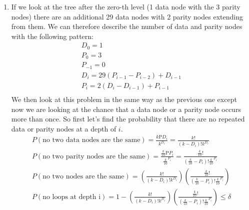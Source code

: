 \documentclass[11pt]{article}
\begin{document}
\begin{enumerate}
\begin{enumerate}
        \item
        	If we look at the tree after the zero-th level (1 data node with the 3 parity nodes) there are an additional 29 data nodes with 2 parity nodes extending from them. We can therefore describe the number of data and parity nodes with the following pattern: \\
	\begin{eqnarray*}
	D_0=1 \\ P_0=3 \\ P_{-1}=0 \\
	D_i=29(P_{i-1}-P_{i-2})+D_{i-1} \\
	P_i=2(D_i-D_{i-1})+P_{i-1} \\
	\end{eqnarray*}
	We then look at this problem in the same way as the previous one except now we are looking at the chance that a data node or a parity node occurs more than once. So first let's find the probability that there are no repeated data or parity nodes at a depth of $i$. \\
	\begin{eqnarray*}
	   P(\mbox{no two data nodes are the same}) = \frac{k\mbox{P}D_i}{k^{D_i}} = \frac{k!}{(k-D_i)!k^{D_i}}\\
	   P(\mbox{no two parity nodes are the same}) = \frac{\frac{k}{10}\mbox{P}P_i}{\frac{k}{10}^{P_i}} = \frac{\frac{k}{10}!}{(\frac{k}{10}-P_i)!\frac{k}{10}^{P_i}}\\
	   P(\mbox{no two nodes are the same}) = \left(\frac{k!}{(k-D_i)!k^{D_i}}\right)\left(\frac{\frac{k}{10}!}{(\frac{k}{10}-P_i)!\frac{k}{10}^{P_i}}\right) \\
	   P(\mbox{no loops at depth i}) = 1- \left(\frac{k!}{(k-D_i)!k^{D_i}}\right)\left(\frac{\frac{k}{10}!}{(\frac{k}{10}-P_i)!\frac{k}{10}^{P_i}}\right) \leq \delta \\
	\end{eqnarray*}
	

\end{enumerate}
\end{enumerate}
\end{document}
